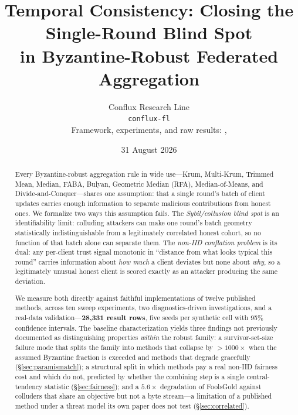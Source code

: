 \documentclass[11pt,a4paper]{article}
\title{\textbf{Temporal Consistency: Closing the Single-Round Blind Spot\\
in Byzantine-Robust Federated Aggregation}}
\author{Conflux Research Line\\
\small \texttt{conflux-fl}\\
\small Framework, experiments, and raw results:
\code{crates/conflux-attacks}, \code{docs/research/}}
\date{31 August 2026}
\begin{document}
\maketitle

\begin{abstract}
Every Byzantine-robust aggregation rule in wide use---Krum, Multi-Krum,
Trimmed Mean, Median, FABA, Bulyan, Geometric Median (RFA),
Median-of-Means, and Divide-and-Conquer---shares one assumption: that a
single round's batch of client updates carries enough information to
separate malicious contributions from honest ones. We formalize two ways
this assumption fails. The \emph{Sybil/collusion blind spot} is an
identifiability limit: colluding attackers can make one round's batch
geometry statistically indistinguishable from a legitimately correlated
honest cohort, so no function of that batch alone can separate them. The
\emph{non-IID conflation problem} is its dual: any per-client trust
signal monotonic in ``distance from what looks typical this round''
carries information about \emph{how much} a client deviates but none
about \emph{why}, so a legitimately unusual honest client is scored
exactly as an attacker producing the same deviation.

We measure both directly against faithful implementations of twelve
published methods, across ten sweep experiments, two diagnostics-driven
investigations, and a real-data validation---\textbf{28{,}331 result
rows}, five seeds per synthetic cell with 95\% confidence intervals. The
baseline characterization yields three findings not previously documented
as distinguishing properties \emph{within} the robust family: a
survivor-set-size failure mode that splits the family into methods that
collapse by ${>}1000\times$ when the assumed Byzantine fraction is
exceeded and methods that degrade gracefully (\S\ref{sec:paramismatch});
a structural split in which methods pay a real non-IID fairness cost and
which do not, predicted by whether the combining step is a single
central-tendency statistic (\S\ref{sec:fairness}); and a $5.6\times$
degradation of FoolsGold against colluders that share an objective but
not a byte stream---a limitation of a published method under a threat
model its own paper does not test (\S\ref{sec:correlated}).


\end{abstract}
\end{document}

